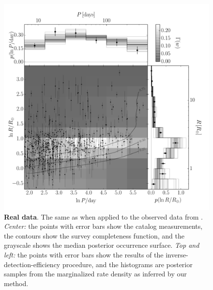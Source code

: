 \begin{figure}[p]
\begin{center}
\includegraphics[width=\textwidth]{figures/exopop/results/results.pdf}
\end{center}
\caption{%
{\bf Real data}.
The same as  when applied to the observed data from
\citet{Petigura:2013}.
\emph{Center:} the points with error bars show the catalog measurements, the
contours show the survey completeness function, and the grayscale shows the
median posterior occurrence surface.
\emph{Top and left:} the points with error bars show the results of the
inverse-detection-efficiency procedure, and the histograms are posterior
samples from the marginalized rate density as inferred by our method.
}
\end{figure}

